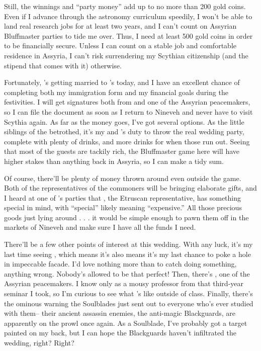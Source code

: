 \documentclass[char]{Kos}
\begin{document}
Still, the winnings and ``party money'' add up to no more than 200 gold coins. Even if I advance through the astronomy curriculum speedily, I won't be able to land real research jobs for at least two years, and I can't count on Assyrian Bluffmaster parties to tide me over. Thus, I need at least 500 gold coins in order to be financially secure. Unless I can count on a stable job and comfortable residence in Assyria, I can't risk surrendering my Scythian citizenship (and the stipend that comes with it) otherwise.

Fortunately, \cBride{}'s getting married to \cPoet{}'s \cGroom{\sibling} \cGroom{} today, and I have an excellent chance of completing both my immigration form and my financial goals during the festivities. I will get signatures both from \cScythiaKing{} and one of the Assyrian peacemakers, so I can file the document as soon as I return to Nineveh and never have to visit Scythia again. As far as the money goes, I've got several options. As the little siblings of the betrothed, it's my and \cPoet{}'s duty to throw the real wedding party, complete with plenty of drinks, and more drinks for when those run out. Seeing that most of the guests are tackily rich, the Bluffmaster game here will have higher stakes than anything back in Assyria, so I can make a tidy sum.

Of course, there'll be plenty of money thrown around even outside the game. Both of the representatives of the commoners will be bringing elaborate gifts, and I heard at one of \cPoet{}'s parties that \cMerchant{}, the Etruscan representative, has something special in mind, with ``special'' likely meaning ``expensive.'' All those precious goods just lying around . . . it would be simple enough to pawn them off in the markets of Nineveh and make sure I have all the funds I need.

There'll be a few other points of interest at this wedding. With any luck, it's my last time seeing \cBride{}, which means it's also means it's my last chance to poke a hole in \cBride{\their} impeccable facade. I'd love nothing more than to catch \cBride{\them} doing something, anything wrong. Nobody's allowed to be that perfect! Then, there's \cAnarchist{}, one of the Assyrian peacemakers. I know \cAnarchist{} only as a mousy professor from that third-year seminar I took, so I'm curious to see what \cAnarchist{\they}'s like outside of class. Finally, there's the ominous warning the Soulblades just sent out to everyone who's ever studied with them-- their ancient assassin enemies, the anti-magic Blackguards, are apparently on the prowl once again. As a Soulblade, I've probably got a target painted on my back, but I can hope the Blackguards haven't infiltrated the wedding, right? Right?
\end{document}
